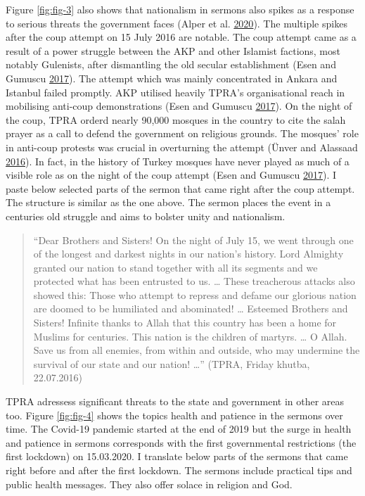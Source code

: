 \documentclass[
  12pt,
]{article}
\begin{document}
Figure \ref{fig:fig-3} also shows that nationalism in sermons also spikes as a response to serious threats the government faces (Alper et al. \protect\hyperlink{ref-alper2020changes}{2020}). The multiple spikes after the coup attempt on 15 July 2016 are notable. The coup attempt came as a result of a power struggle between the AKP and other Islamist factions, most notably Gulenists, after dismantling the old secular establishment (Esen and Gumuscu \protect\hyperlink{ref-esen2017turkey}{2017}). The attempt which was mainly concentrated in Ankara and Istanbul failed promptly. AKP utilised heavily TPRA's organisational reach in mobilising anti-coup demonstrations (Esen and Gumuscu \protect\hyperlink{ref-esen2017turkey}{2017}). On the night of the coup, TPRA orderd nearly 90,000 mosques in the country to cite the salah prayer as a call to defend the government on religious grounds. The mosques' role in anti-coup protests was crucial in overturning the attempt (Ünver and Alassaad \protect\hyperlink{ref-unver2016turks}{2016}). In fact, in the history of Turkey mosques have never played as much of a visible role as on the night of the coup attempt (Esen and Gumuscu \protect\hyperlink{ref-esen2017turkey}{2017}). I paste below selected parts of the sermon that came right after the coup attempt. The structure is similar as the one above. The sermon places the event in a centuries old struggle and aims to bolster unity and nationalism.

\begin{quote}
``Dear Brothers and Sisters! On the night of July 15, we went through one of the longest and darkest nights in our nation's history. Lord Almighty granted our nation to stand together with all its segments and we protected what has been entrusted to us. \ldots{} These treacherous attacks also showed this: Those who attempt to repress and defame our glorious nation are doomed to be humiliated and abominated! \ldots{} Esteemed Brothers and Sisters! Infinite thanks to Allah that this country has been a home for Muslims for centuries. This nation is the children of martyrs. \ldots{} O Allah. Save us from all enemies, from within and outside, who may undermine the survival of our state and our nation! \ldots{}'' (TPRA, Friday khutba, 22.07.2016)
\end{quote}

TPRA adressess significant threats to the state and government in other areas too. Figure \ref{fig:fig-4} shows the topics health and patience in the sermons over time. The Covid-19 pandemic started at the end of 2019 but the surge in health and patience in sermons corresponds with the first governmental restrictions (the first lockdown) on 15.03.2020. I translate below parts of the sermons that came right before and after the first lockdown. The sermons include practical tips and public health messages. They also offer solace in religion and God.
\end{document}
